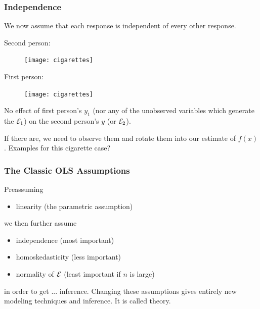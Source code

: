 \documentclass[handout]{beamer}
\begin{document}
\begin{frame}\frametitle{Independence}

We now assume that each response is independent of every other response.\\



\begin{minipage}{0.55\textwidth}
\footnotesize Second person:
\begin{figure}
\centering
\texttt{[image: cigarettes]}
\end{figure}
First person:
\begin{figure}
\centering
\texttt{[image: cigarettes]}
\end{figure}
\end{minipage}
\begin{minipage}{0.35\textwidth}
\normalsize 
\pause 
No effect of first person's $y_1$ (nor any of the unobserved variables which generate the $\mathcal{E}_1$) on the second person's $y$ (or $\mathcal{E}_2$). \\ \pause

If there are, we need to observe them and rotate them into our estimate of $f(x)$. Examples for this cigarette case?
\end{minipage}

\end{frame}


\begin{frame}\frametitle{The Classic OLS Assumptions}

Preassuming

\begin{itemize}
\item linearity (the parametric assumption)
\end{itemize}

we then	further assume

\begin{itemize}
\item independence (most important)
\item homoskedasticity (less important)
\item normality of $\mathcal{E}$ (least important if $n$ is large)
\end{itemize}

in order to get ... \pause inference. Changing these assumptions gives entirely new modeling techniques and inference. It is called  theory.

\end{frame}
\end{document}
